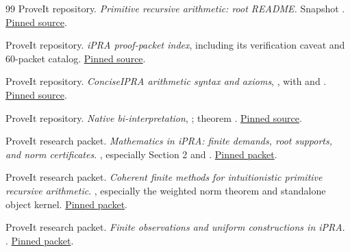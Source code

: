 \begin{thebibliography}{99}
ProveIt repository. \emph{Primitive recursive arithmetic: root README.}
Snapshot .
\href{https://github.com/VladimirReshetnikov/ProveIt/blob/b0f6f535ffc16324683fef2c263260a88ae03755/Logic/PrimitiveRecursiveArithmetic/README.md}{Pinned source}.

ProveIt repository. \emph{iPRA proof-packet index}, including its verification caveat and 60-packet catalog.
\href{https://github.com/VladimirReshetnikov/ProveIt/blob/b0f6f535ffc16324683fef2c263260a88ae03755/Logic/PrimitiveRecursiveArithmetic/docs/proofs/README.md}{Pinned source}.

ProveIt repository. \emph{ConciseIPRA arithmetic syntax and axioms},
, with  and .
\href{https://github.com/VladimirReshetnikov/ProveIt/blob/b0f6f535ffc16324683fef2c263260a88ae03755/Logic/PrimitiveRecursiveArithmetic/ConciseIPRA/Lean/ConciseIPRA/PR.lean}{Pinned source}.

ProveIt repository. \emph{Native bi-interpretation},
; theorem .
\href{https://github.com/VladimirReshetnikov/ProveIt/blob/b0f6f535ffc16324683fef2c263260a88ae03755/Logic/PrimitiveRecursiveArithmetic/ConciseIPRA/Lean/ConciseIPRA/NativeBiInterpretation.lean}{Pinned source}.

ProveIt research packet. \emph{Mathematics in iPRA: finite demands, root supports, and norm certificates}.
, especially Section 2 and
.
\href{https://github.com/VladimirReshetnikov/ProveIt/tree/b0f6f535ffc16324683fef2c263260a88ae03755/Logic/PrimitiveRecursiveArithmetic/docs/proofs/foundations/ipra_finite_demand}{Pinned packet}.

ProveIt research packet. \emph{Coherent finite methods for intuitionistic primitive recursive arithmetic}.
, especially the weighted norm theorem and standalone object kernel.
\href{https://github.com/VladimirReshetnikov/ProveIt/tree/b0f6f535ffc16324683fef2c263260a88ae03755/Logic/PrimitiveRecursiveArithmetic/docs/proofs/foundations/ipra_coherent_methods_2026-11-15}{Pinned packet}.

ProveIt research packet. \emph{Finite observations and uniform constructions in iPRA}.
.
\href{https://github.com/VladimirReshetnikov/ProveIt/tree/b0f6f535ffc16324683fef2c263260a88ae03755/Logic/PrimitiveRecursiveArithmetic/docs/proofs/foundations/ipra_finite_observation}{Pinned packet}.


\end{thebibliography}
